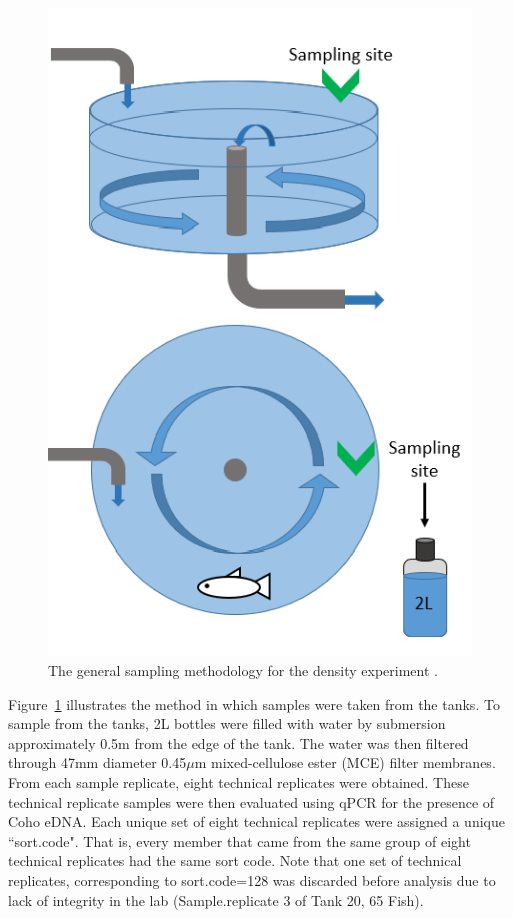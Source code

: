 \begin{figure}[H]
\includegraphics{Chapter3Images/goldstreamupdate.png}
\caption{The general sampling methodology for the density experiment \citep{berg}.}
\label{fig:samplingdensity}
\end{figure}

\newpage

Figure~\ref{fig:samplingdensity} illustrates the method in which samples were taken from the tanks. To sample from the tanks, 2L bottles were filled with water by submersion approximately 0.5m from the edge of the tank. The water was then filtered through 47mm diameter 0.45$\mu$m mixed-cellulose ester (MCE) filter membranes. From each sample replicate, eight technical replicates were obtained. These technical replicate samples were then evaluated using qPCR for the presence of Coho eDNA. Each unique set of eight technical replicates were assigned a unique ``sort.code". That is, every member that came from the same group of eight technical replicates had the same sort code. Note that one set of technical replicates, corresponding to sort.code=128 was discarded before analysis due to lack of integrity in the lab (Sample.replicate 3 of Tank 20, 65 Fish). 

